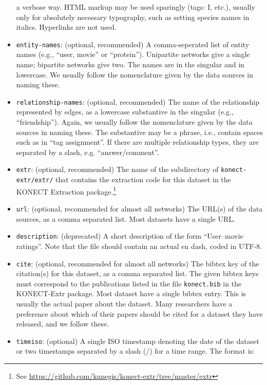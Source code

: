 \documentclass{article}
\begin{document}
\begin{itemize}
  a verbose way.  HTML markup may be used sparingly (tags: I,
  etc.), usually only for absolutely necessary typography, such as
  setting species names in italics.  Hyperlinks are not used. 
\item \texttt{entity-names}: (optional, recommended) A comma-seperated list of
  entity names (e.g., ``user, movie'' or ``protein'').  Unipartite networks give
  a single name; bipartite networks give two.
  The names are in the singular and in lowercase. 
  We usually follow the nomenclature given by the data sources in naming
  these. 
\item \texttt{relationship-names}: (optional, recommended) The name of the
  relationship represented by edges, as a lowercase substantive in the singular (e.g.,
  ``friendship'').
  Again, we usually follow the nomenclature given by the data sources in naming
  these.  The substantive may be a phrase, i.e., contain spaces such as
  in ``tag assignment''.  If there are multiple relationship types, they
  are separated by a slash, e.g. ``answer/comment''.
\item \texttt{extr}: (optional, recommended) The name of the
  subdirectory of \texttt{konect-extr/extr/} that
  contains the extraction code for this dataset in the KONECT
  Extraction package.\footnote{See
    \href{https://github.com/kunegis/konect-extr/tree/master/extr}{https://github.com/kunegis/konect-extr/tree/master/extr}} 
\item \texttt{url}: (optional, recommended for almost all networks) The
  URL(s) of the data sources, as a comma 
  separated list.  Most datasets have a single URL.
\item \texttt{description}: (deprecated) A short description of the form
  ``User–movie ratings''.  Note that the file should contain an
  actual en dash, coded in UTF-8.
\item \texttt{cite}: (optional, recommended for almost all networks) The
  bibtex key of the citation(s) for this dataset, as a  
  comma separated list.  The given bibtex keys must correspond to the
  publications listed in the file \texttt{konect.bib} in the KONECT-Extr
  package. 
  Most dataset have a single bibtex entry.  This
  is usually the actual paper about the dataset.  Many researchers have
  a preference about which of their papers should be cited for a dataset
  they have released, and we follow these. 
\item \texttt{timeiso}: (optional) A single ISO timestamp denoting
  the date of the dataset or two timestamps separated by a
  slash (/) for a time range. The format is:

\end{itemize}
\end{document}
